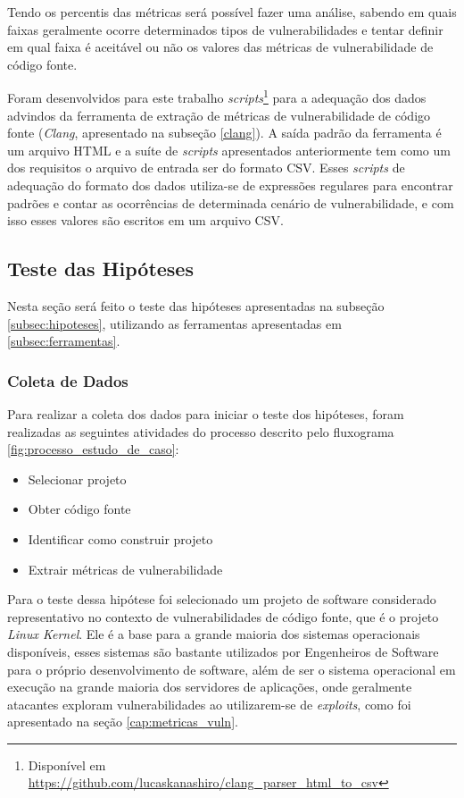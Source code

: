 Tendo os percentis das métricas será possível fazer uma análise, sabendo em quais faixas geralmente ocorre 
determinados tipos de vulnerabilidades e tentar definir em qual faixa é aceitável ou não os valores das métricas de 
vulnerabilidade de código fonte.

Foram desenvolvidos para este trabalho \textit{scripts}\footnote{Disponível em
\url{https://github.com/lucaskanashiro/clang\_parser\_html\_to\_csv}} para a adequação dos
dados advindos da ferramenta de extração de métricas de vulnerabilidade de
código fonte (\emph{Clang}, apresentado na subseção \ref{clang}). A saída padrão
da ferramenta é um arquivo HTML e a suíte de \textit{scripts} apresentados
anteriormente tem como um dos requisitos o arquivo de entrada ser do formato
CSV. Esses \textit{scripts} de adequação do formato dos dados utiliza-se de
expressões regulares para encontrar padrões e contar as ocorrências de
determinada cenário de vulnerabilidade, e com isso esses valores são escritos em
um arquivo CSV.

\subsection{Teste das Hipóteses} \label{subsec:teste_hipotese}

Nesta seção será feito o teste das hipóteses apresentadas na subseção
\ref{subsec:hipoteses}, utilizando as ferramentas apresentadas em \ref{subsec:ferramentas}.

\subsubsection{Coleta de Dados}

Para realizar a coleta dos dados para iniciar o teste dos hipóteses, foram
realizadas as seguintes atividades do processo descrito pelo fluxograma
\ref{fig:processo_estudo_de_caso}:

\begin{itemize}
  \item Selecionar projeto
  \item Obter código fonte
  \item Identificar como construir projeto
  \item Extrair métricas de vulnerabilidade
\end{itemize}

Para o teste dessa hipótese foi selecionado um projeto de software considerado
representativo no contexto de vulnerabilidades de código fonte, que é o projeto
\emph{Linux Kernel}. Ele é a base para a grande maioria dos sistemas operacionais
disponíveis, esses sistemas são bastante utilizados por Engenheiros de Software para
o próprio desenvolvimento de software, além de ser o sistema operacional em
execução na grande maioria dos servidores de aplicações, onde geralmente
atacantes exploram vulnerabilidades ao utilizarem-se de \textit{exploits}, como
foi apresentado na seção \ref{cap:metricas_vuln}.

